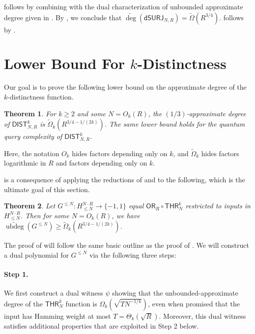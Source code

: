 \documentclass[11pt, letterpaper, fleqn]{article}
\newtheorem{theorem}{Theorem}
\theoremstyle{plain}
\newcommand{\DIST}{\mathsf{DIST}}
\newcommand{\dumSURJ}{\mathsf{dSURJ}}
\newcommand{\OR}{\mathsf{ OR}}
\newcommand{\THR}{\mathsf{THR}}
\newcommand{\bits}{\{-1,1\}}
\newcommand{\promcomp}{G^{\le N}}
\newcommand{\adeg}{\widetilde{\operatorname{deg}}}
\newcommand{\ubdeg}{\widetilde{\operatorname{ubdeg}}}
\begin{document}
 follows by combining  with the dual characterization of unbounded approximate degree given in . By , we conclude that $\adeg(\dumSURJ_{N, R})=\tilde{\Omega}(R^{3/4})$.  follows by .
 

\section{Lower Bound For \texorpdfstring{$k$}{k}-Distinctness}
\label{s:kdist}


Our goal is to prove the following lower bound on the approximate degree of the $k$-distinctness function.

\begin{theorem} \label{thm:dist}
For $k \ge 2$ and some $N = O_k(R)$, the $(1/3)$-approximate degree of $\DIST^k_{N, R}$ is $\tilde{\Omega}_k(R^{3/4 - 1/(2k)})$.
The same lower bound holds for the quantum query complexity of $\DIST^k_{N, R}$.
\end{theorem}
Here, the notation $O_k$ hides factors depending only on $k$, and $\tilde{\Omega}_k$ hides factors logarithmic in $R$ and factors depending only on $k$.


 is a consequence of applying the reductions of  and  to the  following, which is the ultimate goal of this section.

\begin{theorem} \label{thm:dist-promise}
Let $\promcomp : H_{\le N}^{N\cdot R} \to \bits$ equal $\OR_R \circ \THR^k_N$ restricted to inputs in $H_{\le N}^{N \cdot R}$. Then for some $N = O_k(R)$, we have $\ubdeg(\promcomp) \ge \tilde{\Omega}_k(R^{3/4 - 1/(2k)})$.
\end{theorem}


The proof of  will follow the same basic outline as the proof of . We will construct a dual polynomial for $\promcomp$ via the following three steps:

\paragraph{Step 1.} We first construct a dual witness $\psi$ showing that the unbounded-approximate degree of the $\THR^k_N$ function is $\Omega_k\left(\sqrt{T N^{-1/k}}\right)$, even when promised that the input has Hamming weight at most $T = \Theta_k(\sqrt{R})$. Moreover, this dual witness satisfies additional properties
that are exploited in Step 2 below.
\end{document}
